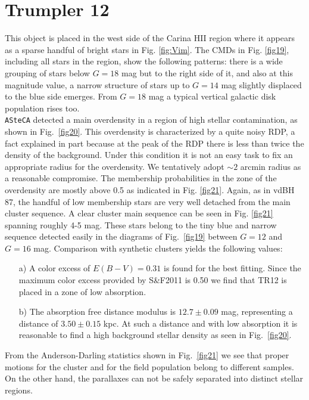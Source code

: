 \documentclass[draft]{aa}
\begin{document}
\section{Trumpler 12}

This object is placed in the west side of the Carina HII region where it appears
as a sparse handful of bright stars in Fig. \ref{fig:Vim}. The CMDs in Fig.
\ref{fig19}, including all stars in the region, show the following patterns:
there is a wide grouping of stars below $G=18$ mag but to the right side of
it, and also at this magnitude value, a narrow structure of stars up to $G=14$
mag slightly displaced to the blue side emerges. From $G=18$ mag a typical
vertical galactic disk population rises too.\\

\texttt{ASteCA} detected a main overdensity in a region of high
stellar contamination, as shown in Fig.~\ref{fig20}.
This overdensity is characterized by a quite noisy RDP, a fact
explained in part because at the peak of the RDP there is less than twice the
density of the background.
Under this condition it is not an easy task to fix an appropriate
radius for the overdensity. We tentatively adopt $\sim2$ arcmin radius as a
reasonable compromise.
The membership probabilities in the zone of the overdensity are mostly
above 0.5 as indicated in Fig. \ref{fig21}. Again, as in vdBH 87, the
handful of low membership stars are very well detached from the main
cluster sequence.
%
A clear cluster main sequence can be seen in Fig. \ref{fig21} spanning roughly
4-5 mag. These stars belong to the tiny blue and narrow sequence detected
easily in the diagrams of Fig.~\ref{fig19} between $G=12$ and $G=16$
mag. Comparison with synthetic clusters yields the following values:

\begin{itemize}
\item [a)] A color excess of $E(B-V)=0.31$ is found for the best fitting.
    Since the maximum color excess provided by S\&F2011 is 0.50 we find that
    TR12 is placed in a zone of low absorption.
\item [b)] The absorption free distance modulus is $12.7\pm0.09$ mag,
representing a distance of $3.50\pm0.15$ kpc. At such a distance and with
low absorption it is reasonable to find a high background stellar density
as seen in Fig.~\ref{fig20}.
\end{itemize}

From the Anderson-Darling statistics shown in Fig.~\ref{fig21} we see that
proper motions for the cluster and for the field population belong to different
samples. On the other hand, the parallaxes can not be safely separated into
distinct stellar regions.\\
\end{document}
